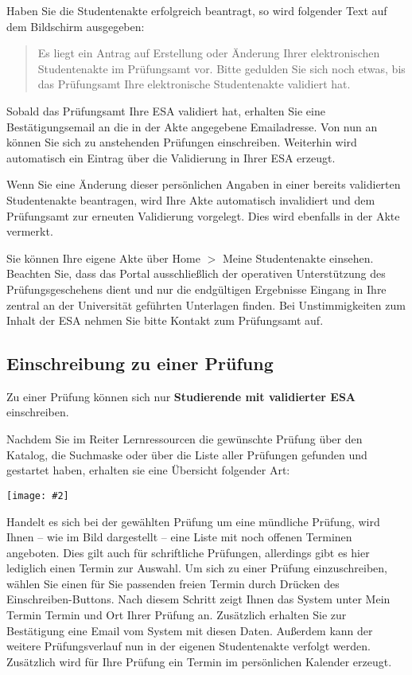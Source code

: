 \documentclass[a4paper,11pt]{article}
\newcommand{\bild}[2]{
    \begin{center}\texttt{[image: \#2]}\end{center}
}
\newcommand{\knopf}[1]{{\sc #1}}
\begin{document}
Haben Sie die Studentenakte erfolgreich beantragt, so wird folgender Text auf
dem Bildschirm ausgegeben:
\begin{quote}
  Es liegt ein Antrag auf Erstellung oder Änderung Ihrer elektronischen
  Studentenakte im Prüfungsamt vor. Bitte gedulden Sie sich noch etwas, bis
  das Prüfungsamt Ihre elektronische Studentenakte validiert hat.
\end{quote}
Sobald das Prüfungsamt Ihre ESA validiert hat, erhalten Sie eine
Bestätigungsemail an die in der Akte angegebene Emailadresse.  Von nun an
können Sie sich zu anstehenden Prüfungen einschreiben. Weiterhin wird
automatisch ein Eintrag über die Validierung in Ihrer ESA erzeugt.

Wenn Sie eine Änderung dieser persönlichen Angaben in einer bereits
validierten Studentenakte beantragen, wird Ihre Akte automatisch invalidiert
und dem Prüfungsamt zur erneuten Validierung vorgelegt. Dies wird ebenfalls in
der Akte vermerkt.

Sie können Ihre eigene Akte über \knopf{Home $>$ Meine Studentenakte}
einsehen.  Beachten Sie, dass das Portal ausschließlich der operativen
Unterstützung des Prüfungsgeschehens dient und nur die endgültigen Ergebnisse
Eingang in Ihre zentral an der Universität geführten Unterlagen finden. Bei
Unstimmigkeiten zum Inhalt der ESA nehmen Sie bitte Kontakt zum Prüfungsamt
auf.

\subsection{Einschreibung zu einer Prüfung}

Zu einer Prüfung können sich nur {\bf Studierende mit validierter ESA}
einschreiben.

Nachdem Sie im Reiter \knopf{Lernressourcen} die gewünschte Prüfung über den
Katalog, die Suchmaske oder über die Liste aller Prüfungen gefunden und
gestartet haben, erhalten sie eine Übersicht folgender Art:

\bild{.9}{Pruefung-Einschreiben}

Handelt es sich bei der gewählten Prüfung um eine mündliche Prüfung, wird
Ihnen -- wie im Bild dargestellt -- eine Liste mit noch offenen Terminen
angeboten.  Dies gilt auch für schriftliche Prüfungen, allerdings gibt es hier
lediglich einen Termin zur Auswahl. Um sich zu einer Prüfung einzuschreiben,
wählen Sie einen für Sie passenden freien Termin durch Drücken des
\knopf{Einschreiben}-Buttons. Nach diesem Schritt zeigt Ihnen das System unter
\knopf{Mein Termin} Termin und Ort Ihrer Prüfung an. Zusätzlich erhalten Sie
zur Bestätigung eine Email vom System mit diesen Daten. Außerdem kann der
weitere Prüfungsverlauf nun in der eigenen Studentenakte verfolgt werden.
Zusätzlich wird für Ihre Prüfung ein Termin im persönlichen Kalender erzeugt.
 
\end{document}
